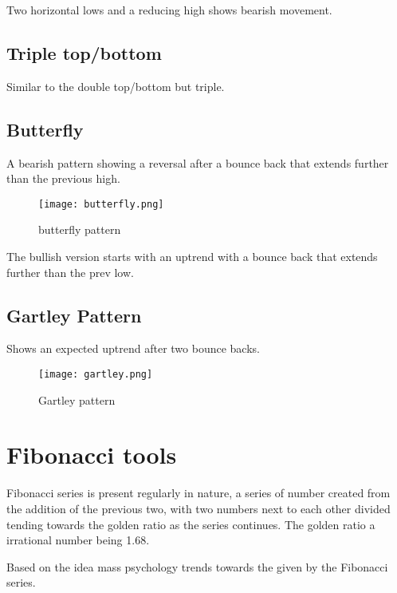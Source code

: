 \documentclass[11pt]{scrartcl} %
\begin{document}
Two horizontal lows and a reducing high shows bearish movement.

\subsection{Triple top/bottom}

Similar to the double top/bottom but triple.

\subsection{Butterfly}

A bearish pattern showing a reversal after a bounce back that extends further than the previous high.

\begin{figure}[t] %
	\centering
	\texttt{[image: butterfly.png]} %
	\caption{butterfly pattern}
\end{figure}

The bullish version starts with an uptrend with a bounce back that extends further than the prev low.

\subsection{Gartley Pattern}

Shows an expected uptrend after two bounce backs.

\begin{figure}[t] %
	\centering
	\texttt{[image: gartley.png]} %
	\caption{Gartley pattern}
\end{figure}

\section{Fibonacci tools}

Fibonacci series is present regularly in nature, a series of number created from the addition of the
previous two, with two numbers next to each other divided tending towards the golden ratio as the 
series continues. The golden ratio a irrational number being 1.68.

Based on the idea mass psychology trends towards the given by the Fibonacci series.
\end{document}
